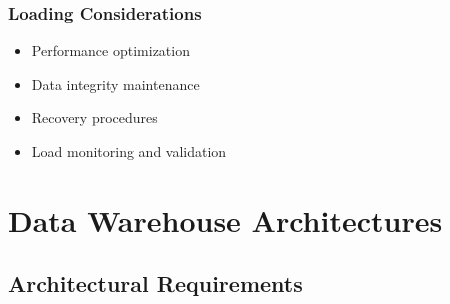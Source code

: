 \subsection{Loading Considerations}
\begin{itemize}
    \item Performance optimization
    \item Data integrity maintenance
    \item Recovery procedures
    \item Load monitoring and validation
\end{itemize}

\chapter{Data Warehouse Architectures}

\section{Architectural Requirements}

